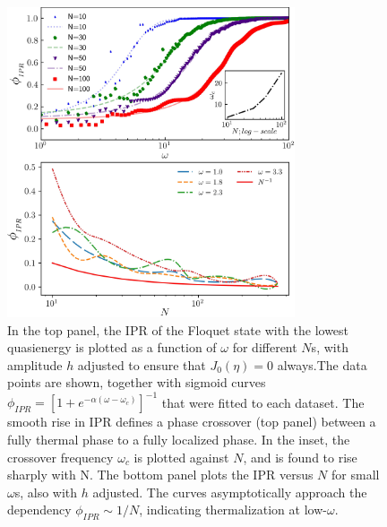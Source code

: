 \documentclass[%
reprint,
superscriptaddress,
amsmath,amssymb,
aps,
prb,
showkeys,
]{revtex4-2}
\begin{document}
\begin{figure}[t!]
	\centering
	\includegraphics[width =8.5cm]{phase_crossover_LMG.jpeg}
	\caption{In the top panel, the IPR of the Floquet state with the lowest quasienergy is plotted as a function of $\omega$ for different $N$s, with amplitude $h$ adjusted to ensure that $J_0(\eta)=0$ always.The data points are shown, together with sigmoid curves $\phi_{IPR}=\left[1+e^{-\alpha\left(\omega-\omega_c\right)}\right]^{-1}$ that were fitted to each dataset. The smooth rise in IPR defines a phase crossover (top panel) between a fully thermal phase to a fully localized phase. In the inset, the crossover frequency $\omega_c$ is plotted against $N$, and  is found to rise sharply with N. The bottom panel plots the IPR versus $N$ for small $\omega$s, also with $h$ adjusted. The curves asymptotically approach the dependency $\phi_{IPR}\sim 1/N$, indicating thermalization at low-$\omega$.}
	\label{fig:phase_crossover}
\end{figure}
\end{document}
